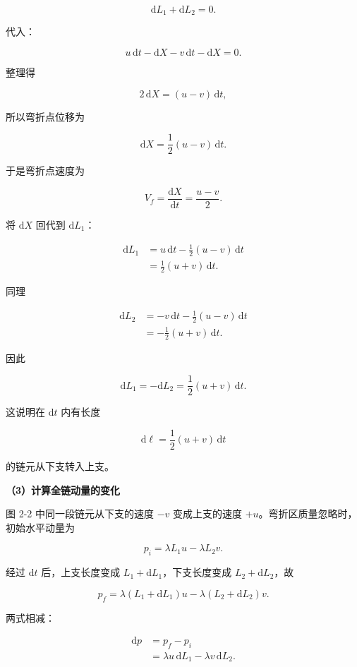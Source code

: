 \documentclass[12pt,a4paper,UTF8]{ctexart}
\begin{document}
\[\mathrm{d}L_1+\mathrm{d}L_2=0.\]

代入：

\[
u\,\mathrm{d}t-\mathrm{d}X-v\,\mathrm{d}t-\mathrm{d}X=0.
\]

整理得

\[
2\,\mathrm{d}X=(u-v)\,\mathrm{d}t,
\]

所以弯折点位移为

\[
\boxed{\mathrm{d}X=\frac12(u-v)\,\mathrm{d}t}.
\]

于是弯折点速度为

\[
\boxed{V_f=\frac{\mathrm{d}X}{\mathrm{d}t}=\frac{u-v}{2}}.
\]

将 \(\mathrm{d}X\) 回代到 \(\mathrm{d}L_1\)：

\[
\begin{aligned}
\mathrm{d}L_1
&=u\,\mathrm{d}t-\frac12(u-v)\,\mathrm{d}t\\
&=\frac12(u+v)\,\mathrm{d}t.
\end{aligned}
\]

同理

\[
\begin{aligned}
\mathrm{d}L_2
&=-v\,\mathrm{d}t-\frac12(u-v)\,\mathrm{d}t\\
&=-\frac12(u+v)\,\mathrm{d}t.
\end{aligned}
\]

因此

\[
\boxed{\mathrm{d}L_1=-\mathrm{d}L_2=\frac12(u+v)\,\mathrm{d}t}.
\]

这说明在 \(\mathrm{d}t\) 内有长度

\[\mathrm{d}\ell=\frac12(u+v)\,\mathrm{d}t\]

的链元从下支转入上支。

\textbf{（3）计算全链动量的变化}

图 2-2 中同一段链元从下支的速度 \(-v\) 变成上支的速度
\(+u\)。弯折区质量忽略时，初始水平动量为

\[
p_i=\lambda L_1u-\lambda L_2v.
\]

经过 \(\mathrm{d}t\) 后，上支长度变成
\(L_1+\mathrm{d}L_1\)，下支长度变成 \(L_2+\mathrm{d}L_2\)，故

\[
p_f=\lambda(L_1+\mathrm{d}L_1)u-\lambda(L_2+\mathrm{d}L_2)v.
\]

两式相减：

\[
\begin{aligned}
\mathrm{d}p
&=p_f-p_i\\
&=\lambda u\,\mathrm{d}L_1-\lambda v\,\mathrm{d}L_2.
\end{aligned}
\]
\end{document}
